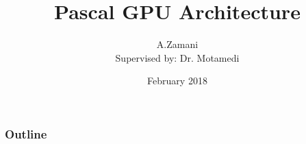 \documentclass{beamer}
\title[Pascal GPU Architecture]{Pascal GPU Architecture} %
\author[A.Zamani]{A.Zamani\\[1mm]{\small Supervised by: Dr. Motamedi}} %
\institute[AUT] %
{
Amirkabir University of Technology \\ %
}
\date[February 2018]{February 2018} %
\begin{document}
	\begin{frame}
	\titlepage %
	\end{frame}

\begin{frame}
\frametitle{Outline} %
\tableofcontents %
\end{frame}


\end{document}
